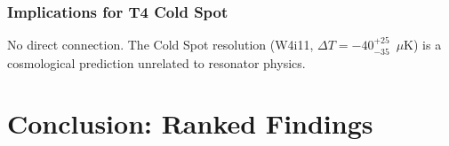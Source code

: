 \documentclass[11pt]{article}
\theoremstyle{definition}
\theoremstyle{remark}
\begin{document}
\section{Implications for T4 Cold Spot}

No direct connection. The Cold Spot resolution (W4i11, $\Delta T =
-40^{+25}_{-35}$~$\mu$K) is a cosmological prediction unrelated to
resonator physics.


\part{Conclusion: Ranked Findings}
\label{part:conclusion}
\end{document}
